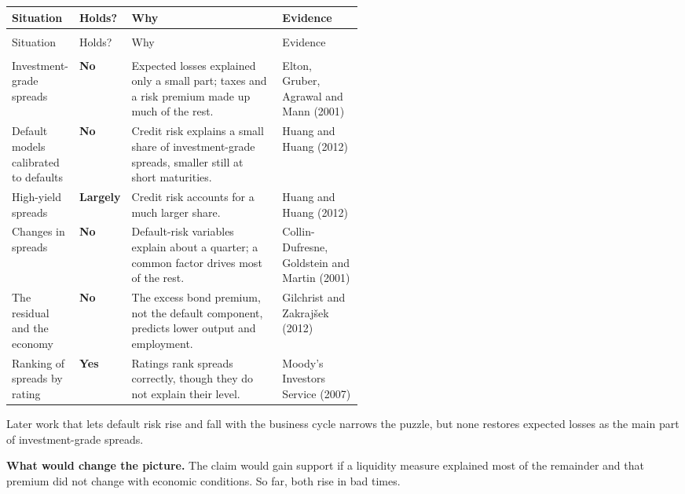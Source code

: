 {\small
\begin{longtable}{@{}>{\raggedright\arraybackslash}p{0.19\linewidth}>{\raggedright\arraybackslash}p{0.10\linewidth}>{\raggedright\arraybackslash}p{}>{\raggedright\arraybackslash}p{0.23\linewidth}@{}}
\toprule
Situation & Holds? & Why & Evidence \\
\midrule
\endfirsthead
\multicolumn{4}{@{}l}{\emph{(continued)}} \\
\toprule
Situation & Holds? & Why & Evidence \\
\midrule
\endhead
\midrule
\multicolumn{4}{r@{}}{\emph{(continued on the next page)}} \\
\endfoot
\bottomrule
\endlastfoot
Investment-grade spreads & \textbf{No} & Expected losses explained only a small part; taxes and a risk premium made up much of the rest. & Elton, Gruber, Agrawal and Mann (2001) \\
\addlinespace[3pt]
Default models calibrated to defaults & \textbf{No} & Credit risk explains a small share of investment-grade spreads, smaller still at short maturities. & Huang and Huang (2012) \\
\addlinespace[3pt]
High-yield spreads & \textbf{Largely} & Credit risk accounts for a much larger share. & Huang and Huang (2012) \\
\addlinespace[3pt]
Changes in spreads & \textbf{No} & Default-risk variables explain about a quarter; a common factor drives most of the rest. & Collin-Dufresne, Goldstein and Martin (2001) \\
\addlinespace[3pt]
The residual and the economy & \textbf{No} & The excess bond premium, not the default component, predicts lower output and employment. & Gilchrist and Zakraj\v{s}ek (2012) \\
\addlinespace[3pt]
Ranking of spreads by rating & \textbf{Yes} & Ratings rank spreads correctly, though they do not explain their level. & Moody's Investors Service (2007) \\
\end{longtable}
}

Later work that lets default risk rise and fall with the business cycle narrows the puzzle, but none restores expected losses as the main part of investment-grade spreads.

\textbf{What would change the picture.} The claim would gain support if a liquidity measure explained most of the remainder and that premium did not change with economic conditions. So far, both rise in bad times.

